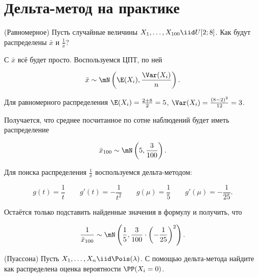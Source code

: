 \documentclass[12pt, a4paper, oneside]{article}
\begin{document}
\section*{Дельта-метод на практике}

\begin{problem}{(Равномерное)}
Пусть случайные величины $X_1, \ldots, X_{100} \iid U[2;8]$. Как будут распределены $\bar{x}$ и $\frac{1}{\bar{x}}$? 
\end{problem} 

\begin{sol}
С $\bar{x}$ всё будет просто. Воспользуемся ЦПТ, по ней 

$$
\bar{x}\sim \mN \left( \E(X_i), \frac{\Var(X_i)}{n} \right).
$$

Для равномерного распределения $\E(X_i) = \frac{2 + 8}{2} = 5$, $\Var(X_i) = \frac{(8-2)^2}{12} = 3$.

Получается, что среднее посчитанное по сотне наблюдений будет иметь распределение 

$$
\bar{x}_{100} \sim \mN \left( 5, \frac{3}{100} \right).
$$

Для поиска распределения $\frac{1}{\bar{x}}$ воспользуемся дельта-методом: 

$$
g(t) = \frac{1}{t} \qquad g'(t) = -\frac{1}{t^2} \qquad g(\mu) = \frac{1}{5} \qquad g'(\mu) = - \frac{1}{25}.
$$

Остаётся только подставить  найденные значения в формулу и получить, что 

$$
\frac{1}{\bar{x}_{100}} \sim \mN \left( \frac{1}{5}, \frac{3}{100} \cdot \left(-\frac{1}{25} \right)^2\right).
$$
\end{sol}

\begin{problem}{(Пуассона)}
Пусть $X_1, \ldots, X_n \iid \Pois(\lambda)$.   С помощью дельта-метода найдите как распределена оценка вероятности $\PP(X_i = 0)$.
\end{problem} 
\end{document}
